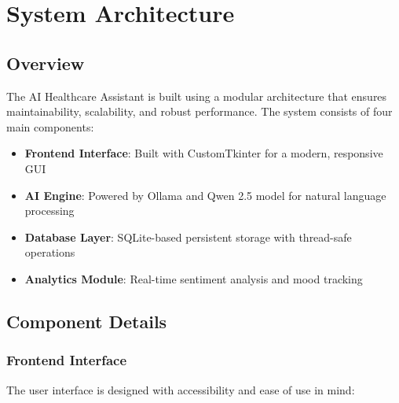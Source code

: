 \documentclass[12pt]{article}
\begin{document}
\section{System Architecture}

\subsection{Overview}
The AI Healthcare Assistant is built using a modular architecture that ensures maintainability, scalability, and robust performance. The system consists of four main components:

\begin{itemize}
    \item \textbf{Frontend Interface}: Built with CustomTkinter for a modern, responsive GUI
    \item \textbf{AI Engine}: Powered by Ollama and Qwen 2.5 model for natural language processing
    \item \textbf{Database Layer}: SQLite-based persistent storage with thread-safe operations
    \item \textbf{Analytics Module}: Real-time sentiment analysis and mood tracking
\end{itemize}

\subsection{Component Details}

\subsubsection{Frontend Interface}
The user interface is designed with accessibility and ease of use in mind:
\end{document}
